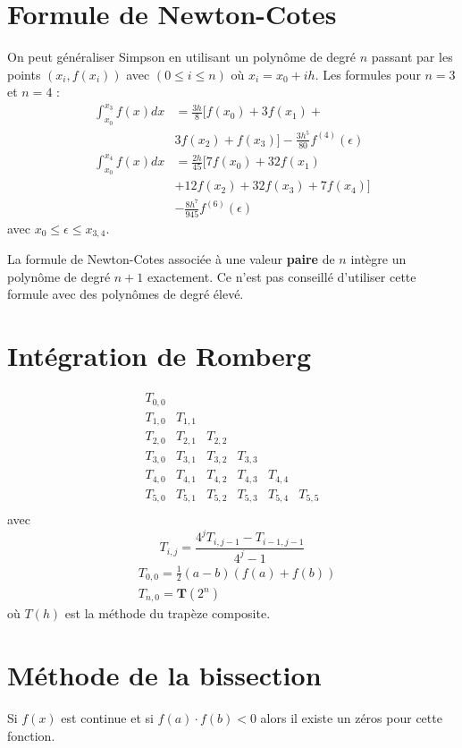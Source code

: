 \documentclass[a4paper,9pt]{extarticle}
\begin{document}
\begin{multicols*}{2}
\section{Formule de Newton-Cotes}
On peut généraliser Simpson en utilisant un polynôme de degré $n$ passant par les points $(x_i,f(x_i))$ avec $(0\leq i\leq n)$ où $x_i=x_0+ih$. Les formules pour $n=3$ et $n=4$ :
\begin{align*}
\int_{x_0}^{x_3}f(x)dx&=\frac{3h}{8}[f(x_0)+3f(x_1)+\\
&3f(x_2)+f(x_3)]-\frac{3h^5}{80}f^{(4)}(\epsilon)\\
\int_{x_0}^{x_4}f(x)dx&=\frac{2h}{45}[7f(x_0)+32f(x_1)\\
&+12f(x_2)+32f(x_3)+7f(x_4)]\\
&-\frac{8h^7}{945}f^{(6)}(\epsilon)
\end{align*}
avec $x_0 \leq \epsilon \leq x_{3,4}$.

La formule de Newton-Cotes associée à une valeur \textbf{paire} de $n$ intègre un polynôme de degré $n+1$ exactement. Ce n'est pas conseillé d'utiliser cette formule avec des polynômes de degré élevé.

\section{Intégration de Romberg}
$$
\begin{array}{cccccc}
T_{0,0} & & & & & \\
T_{1,0} & T_{1,1} & & & & \\
T_{2,0} & T_{2,1} & T_{2,2} & & & \\
T_{3,0} & T_{3,1} & T_{3,2} & T_{3,3} & & \\
T_{4,0} & T_{4,1} & T_{4,2} & T_{4,3} & T_{4,4} & \\
T_{5,0} & T_{5,1} & T_{5,2} & T_{5,3} & T_{5,4} & T_{5,5} \\
\end{array}
$$
avec
$$
T_{i,j}=\frac{4^jT_{i,j-1}-T_{i-1,j-1}}{4^j-1}
$$
\begin{align*}
& T_{0,0}=\frac{1}{2}(a-b)(f(a)+f(b))\\
& T_{n,0}=\textbf{T}(2^n)
\end{align*}
où $T(h)$ est la méthode du trapèze composite.

\section{Méthode de la bissection}

Si $f(x)$ est continue et si $f(a) \cdot f(b) < 0$ alors il existe un zéros pour cette fonction.


\end{multicols*}
\end{document}
